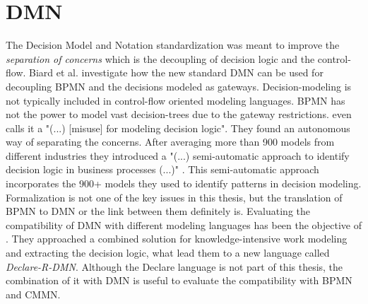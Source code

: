 \section{DMN}
The Decision Model and Notation standardization was meant to improve the \textit{separation of concerns} \cite{BiardMauffBigandEtAl2015} which is the decoupling of decision logic and the control-flow. Biard et al. investigate how the new standard DMN can be used for decoupling BPMN and the decisions modeled as gateways. Decision-modeling is not typically included in control-flow oriented modeling languages. BPMN has not the power to model vast decision-trees due to the gateway restrictions. \cite{BatoulisMeyerBazhenovaEtAl2015} even calls it a "(...) [misuse] for modeling decision logic". They found an autonomous way of separating the concerns. After averaging more than 900 models from different industries they introduced a "(...) semi-automatic approach to identify decision logic in business processes (...)" \cite{BatoulisMeyerBazhenovaEtAl2015}. This semi-automatic approach incorporates the 900+ models they used to identify patterns in decision modeling. Formalization is not one of the key issues in this thesis, but the translation of BPMN to DMN or the link between them definitely is. 
Evaluating the compatibility of DMN with different modeling languages has been the objective of \cite{MertensGaillyPoels2015}. They approached a combined solution for knowledge-intensive work modeling and extracting the decision logic, what lead them to a new language called \textit{Declare-R-DMN}. Although the Declare language is not part of this thesis, the combination of it with DMN is useful to evaluate the compatibility with BPMN and CMMN. 